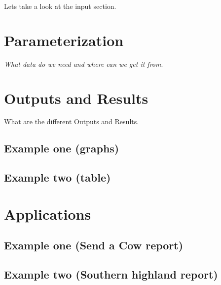 \documentclass[
]{book}
\begin{document}
Lets take a look at the input section.

\hypertarget{parameterization}{%
\chapter{Parameterization}\label{parameterization}}

\emph{What data do we need and where can we get it from}.

\hypertarget{outputs-and-results}{%
\chapter{Outputs and Results}\label{outputs-and-results}}

What are the different Outputs and Results.

\hypertarget{example-one-graphs}{%
\section{Example one (graphs)}\label{example-one-graphs}}

\hypertarget{example-two-table}{%
\section{Example two (table)}\label{example-two-table}}

\hypertarget{applications}{%
\chapter{Applications}\label{applications}}

\hypertarget{example-one-send-a-cow-report}{%
\section{Example one (Send a Cow report)}\label{example-one-send-a-cow-report}}

\hypertarget{example-two-southern-highland-report}{%
\section{Example two (Southern highland report)}\label{example-two-southern-highland-report}}

  
\end{document}
